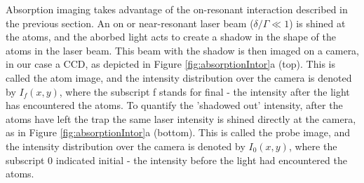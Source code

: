 Absorption imaging takes advantage of the on-resonant interaction described in the previous section. An on or near-resonant laser beam ($\delta/\Gamma\ll 1$) is shined at the atoms, and the aborbed light acts to create a shadow in the shape of the atoms in the laser beam. This beam with the shadow is then imaged on a camera, in our case a CCD, as depicted in Figure \ref{fig:absorptionIntor}a (top). This is called the atom image, and the intensity distribution over the camera is denoted by $I_f(x,y)$, where the subscript f stands for final - the intensity after the light has encountered the atoms. To quantify the 'shadowed out' intensity, after the atoms have left the trap the same laser intensity is shined directly at the camera, as in Figure \ref{fig:absorptionIntor}a (bottom).   This is called the probe image, and the intensity distribution over the camera is denoted by $I_0(x,y)$, where the subscript 0 indicated initial - the intensity before the light had encountered the atoms.




